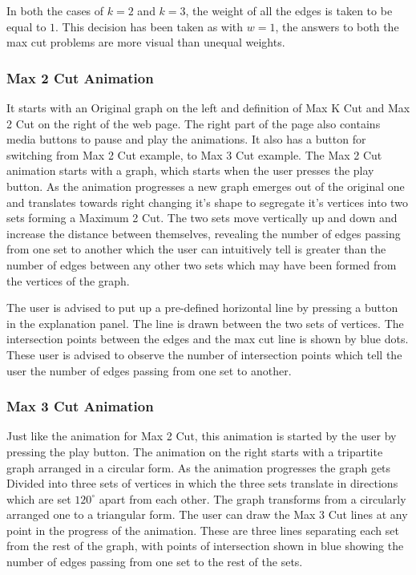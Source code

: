In both the cases of $k=2$ and $k=3$, the weight of all the edges is taken to
be equal to $1$. This decision has been taken as with $w=1$, the answers to
both the max cut problems are more visual than unequal weights.

\subsubsection{Max 2 Cut Animation} 
It starts with an Original graph on the left and definition of Max K Cut and
Max 2 Cut on the right of the web page. The right part of the page also
contains media buttons to pause and play the animations. It also has a button
for switching from Max 2 Cut example, to Max 3 Cut example.  The Max 2 Cut
animation starts with a graph, which starts when the user presses the play
button. As the animation progresses a new graph emerges out of the original
one and translates towards right changing it's shape to segregate it's
vertices into two sets forming a Maximum 2 Cut. The two sets move vertically up
and down and increase the distance between themselves, revealing the
number of edges passing from one set to another which the user can intuitively
tell is greater than the number of edges between any other two sets
which may have been formed from the vertices of the graph.

The user is advised to put up a pre-defined horizontal line by pressing a
button in the explanation panel. The line is drawn between the two sets of
vertices.  The intersection points between the edges and the max cut line is
shown by blue dots. These user is advised to observe the number of intersection
points which tell the user the number of edges passing from one set to another.

\subsubsection{Max 3 Cut Animation}
Just like the animation for Max 2 Cut, this animation is started by the user by
pressing the play button. The animation on the right starts with a tripartite
graph arranged in a circular form. As the animation progresses the graph gets
Divided into three sets of vertices in which the three sets translate in
directions which are set $120^{\circ}$ apart from each other. The graph
transforms from a circularly arranged one to a triangular form. The user can
draw the Max 3 Cut lines at any point in the progress of the animation.  These
are three lines separating each set from the rest of the graph, with points of
intersection shown in blue showing the number of edges passing from one set to
the rest of the sets.


